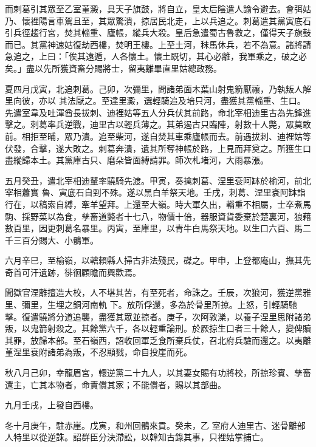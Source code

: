 \begin{pinyinscope}
 而刺葛引其眾至乙室堇澱，具天子旗鼓，將自立，皇太后陰遣人諭令避去。會弭姑乃、懷裡陽言車駕且至，其眾驚潰，掠居民北走，上以兵追之。刺葛遣其黨寅底石引兵徑趨行宮，焚其輜重、廬帳，縱兵大殺。皇后急遣蜀古魯救之，僅得天子旗鼓而已。其黨神速姑復劫西樓，焚明王樓。上至土河，秣馬休兵，若不為意。諸將請急追之，上曰：「俟其遠遁，人各懷土。懷土既切，其心必離，我軍乘之，破之必矣。」盡以先所獲資畜分賜將士，留夷離畢直里姑總政務。



 夏四月戊寅，北追刺葛。己卯，次彌里，問諸弟面木葉山射鬼箭厭禳，乃執叛人解里向彼，亦以
 其法厭之。至達里澱，選輕騎追及培只河，盡獲其黨輜重、生口。先遣室韋及吐渾酋長拔刺、迪裡姑等五人分兵伏其前路，命北宰相迪里古為先鋒進擊之。刺葛率兵逆戰，迪里古以輕兵薄之。其弟遏古只臨陣，射數十人斃，眾莫敢前。相拒至晡，眾乃潰。追至柴河，遂自焚其車乘廬帳而去。前遇拔刺、迪裡姑等伏發，合擊，遂大敗之。刺葛奔潰，遺其所奪神帳於路，上見而拜奠之。所獲生口盡縱歸本土。其黨庫古只、磨朵皆面縛請罪。師次札堵河，大雨暴漲。



 五月癸丑，遣北宰相迪輦率驍騎先渡。甲寅，奏擒刺葛、涅里袞阿缽於榆河，前北宰相蕭實
 魯、寅底石自剄不殊。遂以黑白羊祭天地。壬戌，刺葛、涅里袞阿缽詣行在，以稿索自縛，牽羊望拜。上還至大嶺。時大軍久出，輜重不相屬，士卒煮馬駒、採野菜以為食，孳畜道斃者十七八，物價十倍，器服資貨委棄於楚裏河，狼藉數百里，因更刺葛名暴里。丙寅，至庫里，以青牛白馬祭天地。以生口六百、馬二千三百分賜大、小鶻軍。



 六月辛巳，至榆嶺，以轄賴縣人掃古非法殘民，磔之。甲申，上登都庵山，撫其先奇首可汗遺跡，徘徊顧瞻而興歡焉。



 聞獄官涅離擅造大校，人不堪其苦，有至死者，命誅之。壬辰，次狼河，獲逆黨雅里、彌里，生埋之銅河南軌
 下。放所俘還，多為於骨里所掠。上怒，引輕騎馳擊。復遣驍將分道追襲，盡獲其眾並掠者。庚子，次阿敦濼，以養子涅里思附諸弟叛，以鬼箭射殺之。其餘黨六千，各以輕重論刑。於厥掠生口者三十餘人，變俾贖其罪，放歸本部。至石嶺西，詔收回軍乏食所棄兵仗，召北府兵驗而還之。以夷離堇涅里袞附諸弟為叛，不忍顯戮，命自投崖而死。



 秋八月己卯，幸龍眉宮，轘逆黨二十九人，以其妻女賜有功將校，所掠珍賓、孳畜還主，亡其本物者，命責償其家；不能償者，賜以其部曲。



 九月壬戌，上發自西樓。



 冬十月庚午，駐赤崖。戊寅，和州回鶻來貢。癸未，乙
 室府人迪里古、迷骨離部人特里以從逆誅。詔群臣分決滯訟，以韓知古錄其事，只裡姑掌捕亡。




\end{pinyinscope}
